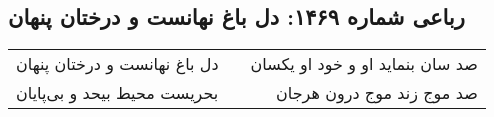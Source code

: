 \begin{center}
\section*{رباعی شماره ۱۴۶۹: دل باغ نهانست و درختان پنهان}
\label{sec:1469}
\begin{longtable}{l p{0.5cm} r}
دل باغ نهانست و درختان پنهان
&&
صد سان بنماید او و خود او یکسان
\\
بحریست محیط بیحد و بی‌پایان
&&
صد موج زند موج درون هرجان
\\
\end{longtable}
\end{center}
